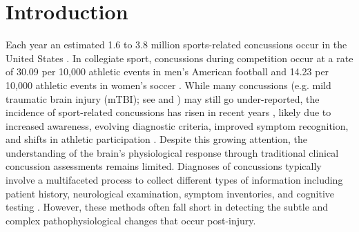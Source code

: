 \documentclass[]{imag-ms-template}
\begin{document}
\section{Introduction}
\label{sec:intro}

Each year an estimated 1.6 to 3.8 million sports-related concussions occur in the United States \parencite{langlois2006EpidemiologyImpactTraumatic,daneshvar2011EpidemiologySportRelatedConcussion,barkhoudarian2016MolecularPathophysiologyConcussive}. In collegiate sport, concussions during competition occur at a rate of 30.09 per 10,000 athletic events in men's American football and 14.23 per 10,000 athletic events in women's soccer \parencite{pierpoint2021EpidemiologySportRelatedConcussion}. While many concussions (e.g. mild traumatic brain injury (mTBI); see \textcite{mayer2017SpectrumMildTraumatic} and \textcite{silverberg2023AmericanCongressRehabilitation}) may still go under-reported, the incidence of sport-related concussions has risen in recent years \parencite{coronado2015TrendsSportsRecreationRelated,pierpoint2021EpidemiologySportRelatedConcussion}, likely due to increased awareness, evolving diagnostic criteria, improved symptom recognition, and shifts in athletic participation \parencite{yang2017NewRecurrentConcussions}. Despite this growing attention, the understanding of the brain's physiological response through traditional clinical concussion assessments remains limited. Diagnoses of concussions typically involve a multifaceted process to collect different types of information including patient history, neurological examination, symptom inventories, and cognitive testing \parencite{patricios2023ConsensusStatementConcussion}. However, these methods often fall short in detecting the subtle and complex pathophysiological changes that occur post-injury.
\end{document}
